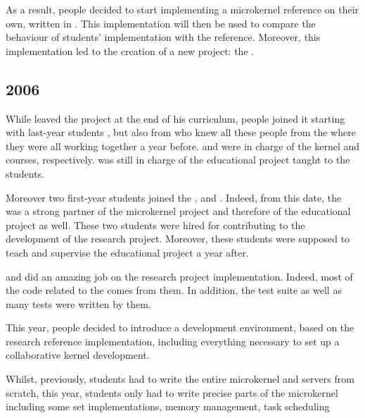 \begin{multicols}{2}
As a result,  people decided to start implementing a
 microkernel reference on their own, written in . This
implementation will then be used to compare the behaviour of students'
implementation with the reference. Moreover, this implementation led to the
creation of a new project: the .

%
%

\subsection{2006}

While  leaved the project at the end of his
 curriculum, people joined it starting with 
last-year students , 
but also  from  who knew all
these people from the 
where they were all working together a year before. 
and  were in charge of the kernel and
 courses, respectively. 
was still in charge of the  educational project taught to the
students.

Moreover two  first-year students joined the ,  and . Indeed, from this date, the 
was a strong partner of the  microkernel project and therefore
of the  educational project as well. These two students
were hired for contributing to the development of the  research
project. Moreover, these students were supposed to teach and supervise the
 educational project a year after.

 and  did an amazing job
on the  research project implementation. Indeed, most of the
code related to the  comes from them. In
addition, the test suite as well as many tests were written by them.

This year,  people decided to introduce a development
environment, based on the  research reference implementation,
including everything necessary to set up a collaborative kernel development.

Whilst, previously, students had to write the entire microkernel and
servers from scratch, this year, students only had to write precise parts
of the microkernel including some set implementations, memory management,
task scheduling \etc{}


\end{multicols}
